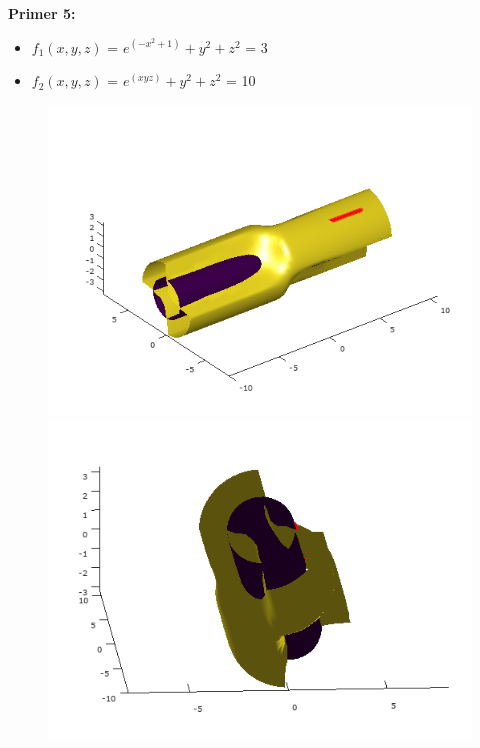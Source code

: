 \documentclass[12pt]{article}
\begin{document}
	\begin{minipage}{\textwidth}
	\textbf{\large{Primer 5:}}
	\begin{itemize}  
		\item $f_{1}(x,y,z)$ = $e^{(-x^{2}+1)}+y^{2}+z^{2}$ = 3
		\item $f_{2}(x,y,z)$ = $e^{(xyz)}+y^{2}+z^{2}$ = 10
	\end{itemize}
	\begin{figure}[H]
    	\centering
    	\includegraphics[scale=0.4]{primer5_1}
    	\includegraphics[scale=0.4]{primer5_2} 

\end{figure}
\end{minipage}
\end{document}
